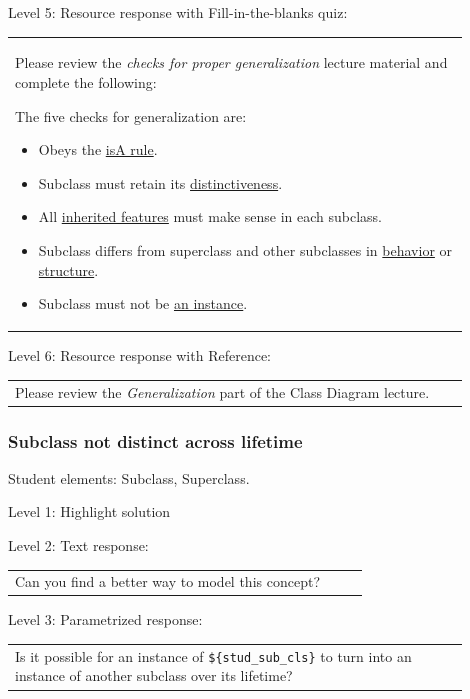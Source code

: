 \noindent Level 5: Resource response with Fill-in-the-blanks quiz: \medskip

\begin{tabular}{|p{0.9\linewidth}}

Please review the \textit{checks for proper generalization} lecture material
and complete the following:

The five checks for generalization are:

\begin{itemize}
    \item Obeys the \underline{isA rule}.
    \item Subclass must retain its \underline{distinctiveness}.
    \item All \underline{inherited features} must make sense in each subclass.
    \item Subclass differs from superclass and other subclasses in \underline{behavior} or \underline{structure}.
    \item Subclass must not be \underline{an instance}.
\end{itemize}

\end{tabular} \medskip

\noindent Level 6: Resource response with Reference: \medskip

\begin{tabular}{|p{0.9\linewidth}}
Please review the \textit{Generalization} part of the Class Diagram lecture.
\end{tabular} \medskip


\subsubsection{Subclass not distinct across lifetime}

Student elements: Subclass, Superclass.  \medskip

\noindent Level 1: Highlight solution  \medskip

\noindent Level 2: Text response: \medskip

\begin{tabular}{|p{0.9\linewidth}}
Can you find a better way to model this concept?
\end{tabular} \medskip

\noindent Level 3: Parametrized response: \medskip

\begin{tabular}{|p{0.9\linewidth}}
Is it possible for an instance of \verb|${stud_sub_cls}| to turn into an instance of another subclass over its lifetime?
\end{tabular} \medskip

